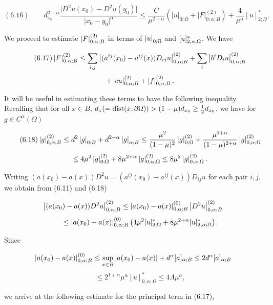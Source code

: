\begin{theorem}
\begin{equation}
(6.16)\qquad d_{x_0}^{2+\alpha}\frac{\lvert D^2u(x_0)-D^2u(y_0)\rvert}{\lvert x_0-y_0\rvert^\alpha}
\le \frac{C}{\mu^{2+\alpha}}\left(\lvert u\rvert_{0;\Omega}+\lvert F\rvert^{(2)}_{0;\alpha;B}\right)
+ \frac{4}{\mu^\alpha}[u]^{*}_{2;\Omega}.
\end{equation}



We proceed to estimate $\left|F\right|^{(2)}_{0,\alpha;B}$ in terms of $\left|u\right|_{0;\Omega}$ and $[u]^{\ast}_{2,\alpha;\Omega}$. We have

\begin{equation}\tag{6.17}
\left|F\right|^{(2)}_{0,\alpha;B}\leq \sum_{i,j}\left|(a^{ij}(x_0)-a^{ij}(x))D_{ij}u\right|^{(2)}_{0,\alpha;B}+\sum_i \left|b^iD_i u\right|^{(2)}_{0,\alpha;B}
\end{equation}
\[
\qquad +\left|cu\right|^{(2)}_{0,\alpha;B}+\left|f\right|^{(2)}_{0,\alpha;B}.
\]

It will be useful in estimating these terms to have the following inequality.
Recalling that for all $x\in B$, $d_x(=\operatorname{dist}(x,\partial\Omega))>(1-\mu)d_{x_0}\geq \frac12 d_{x_0}$, we have for
$g\in C^\alpha(\Omega)$

\begin{equation}\tag{6.18}
\left|g\right|^{(2)}_{0,\alpha;B}\leq d^2\left|g\right|_{0;B}+d^{2+\alpha}\left|g\right|_{\alpha;B}
\leq \frac{\mu^2}{(1-\mu)^2}\left|g\right|^{(2)}_{0;\Omega}+\frac{\mu^{2+\alpha}}{(1-\mu)^{2+\alpha}}\left|g\right|^{(2)}_{0,\alpha;\Omega}
\end{equation}
\[
\qquad \leq 4\mu^2\left|g\right|^{(2)}_{0;\Omega}+8\mu^{2+\alpha}\left|g\right|^{(2)}_{0,\alpha;\Omega}\leq 8\mu^2\left|g\right|^{(2)}_{0,\alpha;\Omega}.
\]

Writing $(a(x_0)-a(x))D^2u=(a^{ij}(x_0)-a^{ij}(x))D_{ij}u$ for each pair $i,j$, we obtain
from (6.11) and (6.18)

\[
\left|(a(x_0)-a(x))D^2u\right|^{(2)}_{0,\alpha;B}\leq \left|a(x_0)-a(x)\right|^{(0)}_{0,\alpha;B}\left|D^2u\right|^{(2)}_{0,\alpha;B}
\]
\[
\qquad \leq \left|a(x_0)-a(x)\right|^{(0)}_{0,\alpha;B}\bigl(4\mu^2[u]^{\ast}_{2;\Omega}+8\mu^{2+\alpha}[u]^{\ast}_{2,\alpha;\Omega}\bigr).
\]

Since

\[
\left|a(x_0)-a(x)\right|^{(0)}_{0,\alpha;B}\leq \sup_{x\in B}\left|a(x_0)-a(x)\right|+d^\alpha[a]_{\alpha;B}\leq 2d^\alpha[a]_{\alpha;B}
\]
\[
\qquad \leq 2^{1+\alpha}\mu^\alpha[u]^{\ast}_{0,\alpha;\Omega}\leq 4\Lambda\mu^\alpha,
\]

we arrive at the following estimate for the principal term in (6.17),


\end{theorem}

